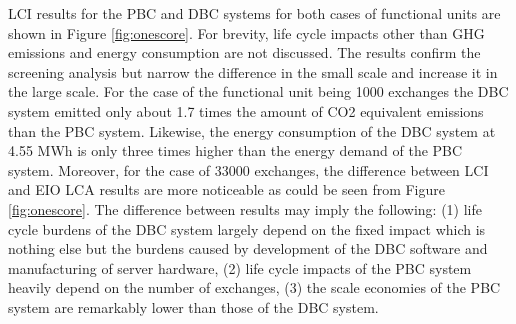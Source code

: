 \documentclass[3p,times,procedia]{elsarticle}
\begin{document}
LCI results for the PBC and DBC systems for both cases of functional units are shown in Figure \ref{fig:onescore}. For brevity, life cycle impacts other than GHG emissions and energy consumption are not discussed. The results confirm the screening analysis but narrow the difference in the small scale and increase it in the large scale. For the case of the functional unit being 1000 exchanges the DBC system emitted only about 1.7 times the amount of CO2 equivalent emissions than the PBC system. Likewise, the energy consumption of the DBC system at 4.55 MWh is only three times higher than the energy demand of the PBC system. Moreover, for the case of 33000 exchanges, the difference between LCI and EIO LCA results are more noticeable as could be seen from Figure \ref{fig:onescore}. The difference between results may imply the following: (1) life cycle burdens of the DBC system largely depend on the fixed impact which is nothing else but the burdens caused by development of the DBC software and manufacturing of server hardware, (2) life cycle impacts of the PBC system heavily depend on the number of exchanges, (3) the scale economies of the PBC system are remarkably lower than those of the DBC system.
\end{document}
